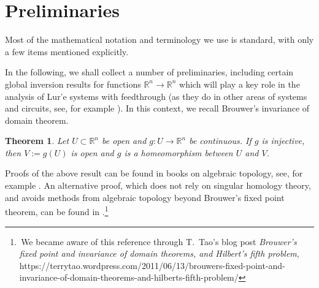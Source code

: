 \documentclass[a4paper,11pt]{article}
\newcommand{\R}{\mathbb R}
\numberwithin{equation}{section}
\numberwithin{figure}{section}
\numberwithin{table}{section}
\newtheorem{theorem}{Theorem}[section]
\begin{document}
\section{Preliminaries}\label{sec:preliminaries}
%
Most of the mathematical notation and terminology we use is standard, with only a few items mentioned explicitly.

In the following, we shall collect a number of preliminaries, including certain global inversion results for functions
$\R^n\to\R^n$ which will play a key role in the analysis of Lur'e systems with feedthrough
(as they do in other areas of systems and circuits, see, for example \cite{bl07,s80,s02,wd72}).
In this context, we recall Brouwer's invariance of domain theorem.
%
\begin{theorem}\label{thm:invariance_of_domain}
Let $U\subset\R^n$ be open and $g:U\to\R^n$ be continuous. If $g$ is injective, then $V:=g(U)$ is
open and $g$ is a homeomorphism between $U$ and $V$.
\end{theorem}
%
Proofs of the above result can be found in books on algebraic topology, see, for example
\cite[Theorem 6.10.7]{d18}. An alternative proof, which does not rely on singular homology theory, and avoids methods from algebraic topology beyond Brouwer's fixed point theorem, can be found in
\cite{k98}.\footnote[2]{\,We became aware of this reference through T.\ Tao's blog post {\it Brouwer's fixed point and invariance of domain theorems, and Hilbert's fifth problem},
https://terrytao.wordpress.com/2011/06/13/brouwers-fixed-point-and-invariance-of-domain-theorems-and-hilberts-fifth-problem/}
\end{document}
